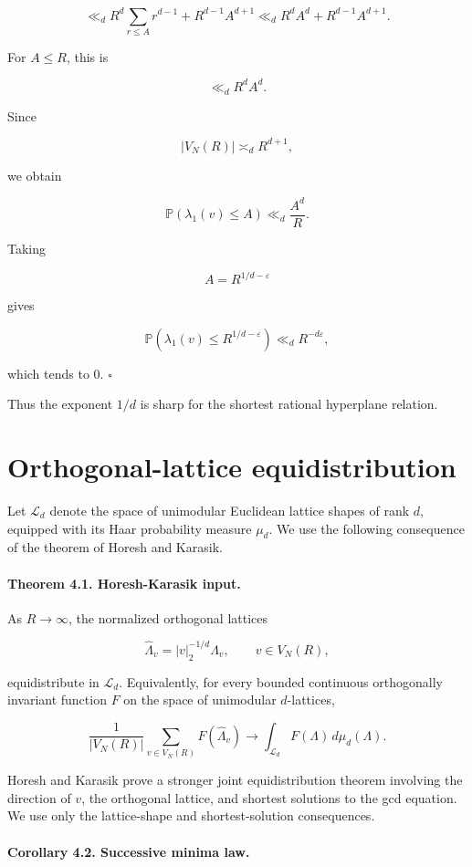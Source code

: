 \documentclass[11pt]{article}
\begin{document}
\[
\ll_d
R^d\sum_{r\le A}r^{d-1}
+
R^{d-1}A^{d+1}
\ll_d
R^dA^d+R^{d-1}A^{d+1}.
\]

For $A\le R$, this is

\[
\ll_d R^dA^d.
\]

Since

\[
|V_N(R)|\asymp_d R^{d+1},
\]

we obtain

\[
\mathbb P(\lambda_1(v)\le A)\ll_d \frac{A^d}{R}.
\]

Taking

\[
A=R^{1/d-\varepsilon}
\]

gives

\[
\mathbb P(\lambda_1(v)\le R^{1/d-\varepsilon})
\ll_d R^{-d\varepsilon},
\]

which tends to $0$. $\square$

Thus the exponent $1/d$ is sharp for the shortest rational hyperplane relation.

\section{Orthogonal-lattice equidistribution}

Let $\mathscr L_d$ denote the space of unimodular Euclidean lattice shapes of rank $d$, equipped with its Haar probability measure $\mu_d$. We use the following consequence of the theorem of Horesh and Karasik.

\paragraph{Theorem 4.1. Horesh-Karasik input.}

As $R\to\infty$, the normalized orthogonal lattices

\[
\widehat\Lambda_v=|v|_2^{-1/d}\Lambda_v,
\qquad v\in V_N(R),
\]

equidistribute in $\mathscr L_d$. Equivalently, for every bounded continuous orthogonally invariant function $F$ on the space of unimodular $d$-lattices,

\[
\frac1{|V_N(R)|}
\sum_{v\in V_N(R)}
F(\widehat\Lambda_v)
\longrightarrow
\int_{\mathscr L_d}F(\Lambda)\,d\mu_d(\Lambda).
\]

Horesh and Karasik prove a stronger joint equidistribution theorem involving the direction of $v$, the orthogonal lattice, and shortest solutions to the gcd equation. We use only the lattice-shape and shortest-solution consequences.

\paragraph{Corollary 4.2. Successive minima law.}
\end{document}
